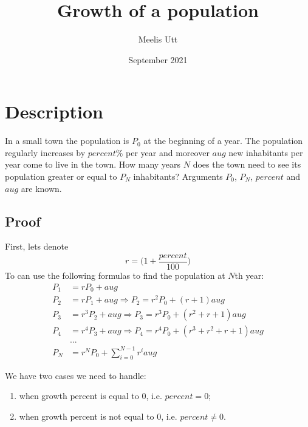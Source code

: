\documentclass[12pt]{article}
\title{Growth of a population}
\author{Meelis Utt}
\date{September 2021}
\begin{document}
\maketitle

\section*{Description}
In a small town the population is $P_0$ at the beginning of a year.
The population regularly increases by $percent\%$ per year and moreover $aug$ new inhabitants per year come to live in the town.
How many years $N$ does the town need to see its population greater or equal to $P_N$ inhabitants?
Arguments $P_0$, $P_N$, $percent$ and $aug$ are known.

\subsection*{Proof}
First, lets denote
\begin{equation*}
    r = \bigg(1+\frac{percent}{100}\bigg)
\end{equation*}
To can use the following formulas to find the population at $N$th year:
\begin{align}
    \nonumber P_1 &= rP_0 + aug\\
    \nonumber P_2 &= rP_1 + aug \Rightarrow P_2 = r^{2}P_0 + (r + 1)aug\\
    \nonumber P_3 &= r^{3}P_2 + aug \Rightarrow P_3 = r^{3}P_0 + (r^{2} + r + 1)aug\\
    \nonumber P_4 &= r^{4}P_3 + aug \Rightarrow P_4 = r^{4}P_0 + (r^{3} + r^{2} + r + 1)aug\\
    \nonumber &...\\
    P_N &= r^{N}P_0 + \sum_{i=0}^{N-1}r^{i}aug \label{growth-fun}
\end{align}

We have two cases we need to handle:
\begin{enumerate}
    \item when growth percent is equal to $0$, i.e. $percent = 0$;
    \item when growth percent is not equal to $0$, i.e. $percent \ne 0$.
\end{enumerate}
\end{document}
